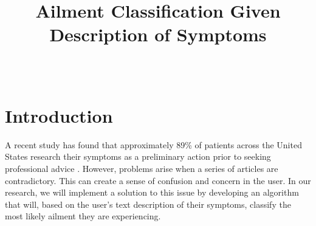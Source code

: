 \documentclass[12pt, final, onecolumn, comsoc, conference]{IEEEtran}
\begin{document}
\title{Ailment Classification Given Description of Symptoms}
\author{
	\\
}

\maketitle
\section{Introduction} A recent study has found that approximately
89\% of patients across the United States research their symptoms as a
preliminary action prior to seeking professional advice \cite{guarino_2019}. However,
problems arise when a series of articles are contradictory. This
can create a sense of confusion and concern in the user. In our research, we will
implement a solution to this issue by developing an algorithm that will, based
on the user's text description of their symptoms, classify the most likely
ailment they are experiencing.
\end{document}
